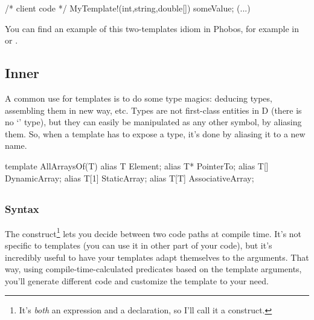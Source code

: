 \begin{dcode}
/* client code */
MyTemplate!(int,string,double[]) someValue;
(...)
\end{dcode}

You can find an example of this two-templates idiom in Phobos, for example in  or .

\subsection{\texorpdfstring{Inner }
                           {Inner alias}}
\label{inneralias}

A common use for templates is to do some type magics: deducing types, assembling them in new way, etc. Types are not first-class entities in D (there is no `' type), but they can easily be manipulated as any other symbol, by aliasing them. So, when a template has to expose a type, it's done by aliasing it to a new name.
\begin{dcode}
template AllArraysOf(T)
{
    alias T    Element;
    alias T*   PointerTo;
    alias T[]  DynamicArray;
    alias T[1] StaticArray;
    alias T[T] AssociativeArray;
}
\end{dcode}


\subsection{\texorpdfstring{}
                           {static if}}
\label{staticif}

\subsubsection{Syntax}

The  construct\footnote{ It's \emph{both} an expression and a declaration, so I'll call it a construct.}
lets you decide between two code paths at compile time. It's not specific to templates (you can use it in other part of your code), but it's incredibly useful to have your templates adapt themselves to the arguments. That way, using compile-time-calculated predicates based on the template arguments, you'll generate different code and customize the template to your need.


